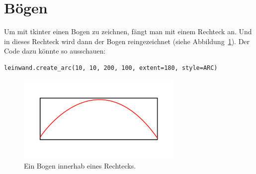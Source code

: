 \section{Bögen}

Um mit tkinter einen Bogen zu zeichnen, fängt man mit einem Rechteck an. Und in dieses Rechteck wird dann der Bogen reingezeichnet (siehe Abbildung~\ref{fig36}). Der Code dazu könnte so ausschauen:

\begin{Verbatim}[frame=single]
leinwand.create_arc(10, 10, 200, 100, extent=180, style=ARC)
\end{Verbatim}

\begin{figure}
\begin{center}
\includegraphics[width=80mm]{images/figure36}
\end{center}
\caption{Ein Bogen innerhab eines Rechtecks.}\label{fig36}
\end{figure}

